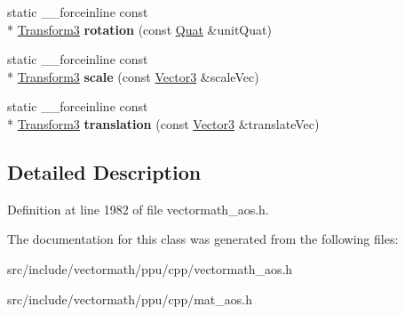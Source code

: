 \begin{DoxyCompactItemize}
\item 
\hypertarget{classVectormath_1_1Aos_1_1Transform3_a8511010a6ffaa490da0a56673c639507}{static \-\_\-\-\_\-forceinline const \\*
\hyperlink{classVectormath_1_1Aos_1_1Transform3}{Transform3} {\bfseries rotation} (const \hyperlink{classVectormath_1_1Aos_1_1Quat}{Quat} \&unit\-Quat)}\label{classVectormath_1_1Aos_1_1Transform3_a8511010a6ffaa490da0a56673c639507}

\item 
\hypertarget{classVectormath_1_1Aos_1_1Transform3_a72cc51c6b23e363a590f727149e24127}{static \-\_\-\-\_\-forceinline const \\*
\hyperlink{classVectormath_1_1Aos_1_1Transform3}{Transform3} {\bfseries scale} (const \hyperlink{classVectormath_1_1Aos_1_1Vector3}{Vector3} \&scale\-Vec)}\label{classVectormath_1_1Aos_1_1Transform3_a72cc51c6b23e363a590f727149e24127}

\item 
\hypertarget{classVectormath_1_1Aos_1_1Transform3_a93e1a7dd7f5a5dcd7bd104e6ce5ee27d}{static \-\_\-\-\_\-forceinline const \\*
\hyperlink{classVectormath_1_1Aos_1_1Transform3}{Transform3} {\bfseries translation} (const \hyperlink{classVectormath_1_1Aos_1_1Vector3}{Vector3} \&translate\-Vec)}\label{classVectormath_1_1Aos_1_1Transform3_a93e1a7dd7f5a5dcd7bd104e6ce5ee27d}

\end{DoxyCompactItemize}


\subsection{Detailed Description}


Definition at line 1982 of file vectormath\-\_\-aos.\-h.



The documentation for this class was generated from the following files\-:\begin{DoxyCompactItemize}
\item 
src/include/vectormath/ppu/cpp/vectormath\-\_\-aos.\-h\item 
src/include/vectormath/ppu/cpp/mat\-\_\-aos.\-h\end{DoxyCompactItemize}
